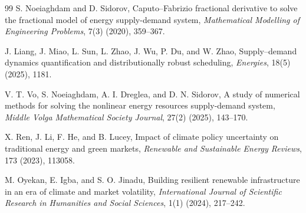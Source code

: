 \documentclass[11pt]{article}
\numberwithin{equation}{section}
\begin{document}
\begin{thebibliography}{99}
S. Noeiaghdam and D. Sidorov,
Caputo--Fabrizio fractional derivative to solve the fractional model of energy supply-demand system,
\emph{Mathematical Modelling of Engineering Problems}, 7(3) (2020), 359--367.

J. Liang, J. Miao, L. Sun, L. Zhao, J. Wu, P. Du, and W. Zhao,
Supply--demand dynamics quantification and distributionally robust scheduling,
\emph{Energies}, 18(5) (2025), 1181.

V. T. Vo, S. Noeiaghdam, A. I. Dreglea, and D. N. Sidorov,
A study of numerical methods for solving the nonlinear energy resources supply-demand system,
\emph{Middle Volga Mathematical Society Journal}, 27(2) (2025), 143--170.

X. Ren, J. Li, F. He, and B. Lucey,
Impact of climate policy uncertainty on traditional energy and green markets,
\emph{Renewable and Sustainable Energy Reviews}, 173 (2023), 113058.

M. Oyekan, E. Igba, and S. O. Jinadu,
Building resilient renewable infrastructure in an era of climate and market volatility,
\emph{International Journal of Scientific Research in Humanities and Social Sciences}, 1(1) (2024), 217--242.

\end{thebibliography}
\end{document}

